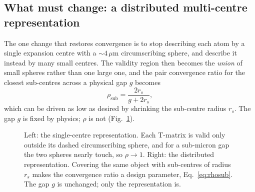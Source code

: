 \documentclass[11pt,a4paper]{article}
\newcommand{\um}{\ensuremath{\,\mu\mathrm{m}}}
\theoremstyle{plain}
\theoremstyle{definition}
\begin{document}
\subsection{What must change: a distributed multi-centre representation}
\label{sec:multicentre}

The one change that restores convergence is to stop describing each atom by a
single expansion centre with a $\sim\!4\um$ circumscribing sphere, and describe
it instead by many small centres. The validity region then becomes the
\emph{union} of small spheres rather than one large one, and the pair convergence
ratio for the closest sub-centres across a physical gap $g$ becomes
\begin{equation}
  \rho_{\text{sub}} = \frac{2 r_s}{g + 2 r_s} ,
  \label{eq:rhosub}
\end{equation}
which can be driven as low as desired by shrinking the sub-centre radius $r_s$.
The gap $g$ is fixed by physics; $\rho$ is not (Fig.~\ref{fig:multicentre}).

\begin{figure}[htbp]
\centering
{}
\caption{Left: the single-centre representation. Each T-matrix is valid only
outside its dashed circumscribing sphere, and for a sub-micron gap the two
spheres nearly touch, so $\rho \to 1$. Right: the distributed representation.
Covering the same object with sub-centres of radius $r_s$ makes the convergence
ratio a design parameter, Eq.~\eqref{eq:rhosub}. The gap $g$ is unchanged; only
the representation is.}
\label{fig:multicentre}
\end{figure}
\end{document}
